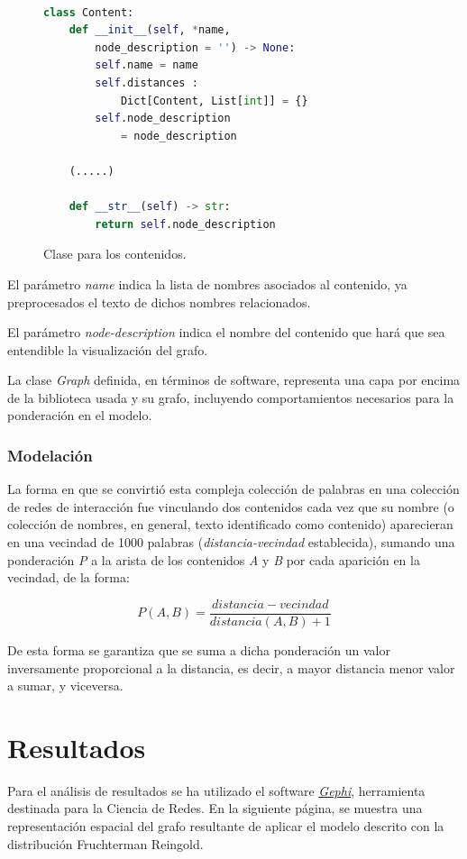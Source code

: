 \documentclass[a4paper,10pt,twocolumn]{article}
\begin{document}
        
    \begin{figure}[htb]%
			\begin{lstlisting}[language=python]%

class Content:
    def __init__(self, *name, 
        node_description = '') -> None:
        self.name = name
        self.distances : 
            Dict[Content, List[int]] = {}
        self.node_description 
            = node_description
        
    (.....)
    
    def __str__(self) -> str:
        return self.node_description
			\end{lstlisting}
		\caption{Clase para los contenidos.\label{fig:code}}
		\end{figure}
        
        
        El parámetro \emph{name} indica la lista de nombres asociados al contenido, ya preprocesados el texto de dichos nombres relacionados.  

        El parámetro \emph{node-description} indica el nombre del contenido que hará que sea entendible la visualización del grafo.

        La clase \emph{Graph} definida, en términos de software, representa una capa por encima de la biblioteca usada y su grafo, incluyendo comportamientos necesarios para la ponderación en el modelo.

        \subsubsection{Modelación}

        La forma en que se convirtió esta compleja colección de palabras en una colección de redes de interacción fue vinculando dos contenidos cada vez que su nombre (o colección de nombres, en general, texto identificado como contenido) aparecieran en una vecindad de 1000 palabras (\emph{distancia-vecindad} establecida), sumando una ponderación \emph{P} a la arista de los contenidos \emph{A} y \emph{B} por cada aparición en la vecindad, de la forma:


        $$ P(A, B) = \frac{distancia-vecindad}{distancia(A, B) + 1}$$


        De esta forma se garantiza que se suma a dicha ponderación un valor inversamente proporcional a la distancia, es decir, a mayor distancia menor valor a sumar, y viceversa. 

        \section{Resultados}
        Para el análisis de resultados se ha utilizado el software \href{https://gephi.org}{\emph{Gephi}}, herramienta destinada para la Ciencia de Redes.
        \newpage
        En la siguiente página, se muestra una representación espacial del grafo resultante de aplicar el modelo descrito con la distribución Fruchterman Reingold.
\end{document}

